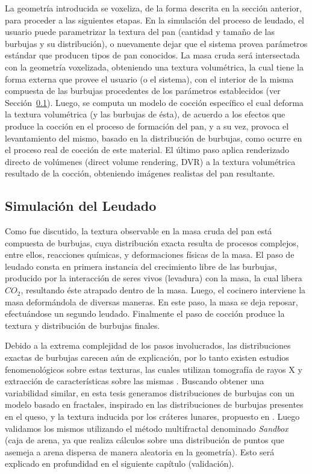 La geometría introducida se voxeliza, de la forma descrita en la sección anterior, para proceder a las siguientes etapas.
En la simulación del proceso de leudado, el usuario puede parametrizar la textura del pan (cantidad y tamaño de las burbujas y su distribución), o nuevamente dejar que el sistema provea parámetros estándar que producen tipos de pan conocidos.
La masa cruda será intersectada con la geometría voxelizada, obteniendo una textura volumétrica, la cual tiene la forma externa que provee el usuario (o el sistema), con el interior de la misma compuesta de las burbujas procedentes de los parámetros establecidos (ver Sección~\ref{breadprov}).
Luego, se computa un modelo de cocción específico \cite{Powathil2004} el cual deforma la textura volumétrica (y las burbujas de ésta), de acuerdo a los efectos que produce la cocción en el proceso de formación del pan, y a su vez, provoca el levantamiento del mismo, basado en la distribución de burbujas, como ocurre en el proceso real de cocción de este material.
El último paso aplica renderizado directo de volúmenes (direct volume rendering, DVR) \cite{Kruger2003} a la textura volumétrica resultado de la cocción, obteniendo imágenes realistas del pan resultante.



\subsection{Simulación del Leudado}
\label{breadprov}
Como fue discutido, la textura observable en la masa cruda del pan está compuesta de burbujas, cuya distribución exacta resulta de procesos complejos, entre ellos, reacciones químicas, y deformaciones físicas de la masa.
El paso de leudado consta en primera instancia del crecimiento libre de las burbujas, producido por la interacción de seres vivos (levadura) con la masa, la cual libera $CO_{2}$, resultando éste atrapado dentro de la masa.
Luego, el cocinero interviene la masa deformándola de diversas maneras.
En este paso, la masa se deja reposar, efectuándose un segundo leudado.
Finalmente el paso de cocción produce la textura y distribución de burbujas finales.

Debido a la extrema complejidad de los pasos involucrados, las distribuciones exactas de burbujas carecen aún de explicación, por lo tanto existen estudios fenomenológicos sobre estas texturas, las cuales utilizan tomografía de rayos X y extracción de características sobre las mismas \cite{Babin2006,Gonzales2008,VanDyck2014}.
Buscando obtener una variabilidad similar, en esta tesis generamos distribuciones de burbujas con un modelo basado en fractales, inspirado en las distribuciones de burbujas presentes en el queso, y la textura inducida por los cráteres lunares, propuesto en \cite{Mandelbrot1983}.
Luego validamos los mismos utilizando el método multifractal denominado {\em Sandbox} (caja de arena, ya que realiza cálculos sobre una distribución de puntos que asemeja a arena dispersa de manera aleatoria en la geometría).
Esto será explicado en profundidad en el siguiente capítulo (validación).

